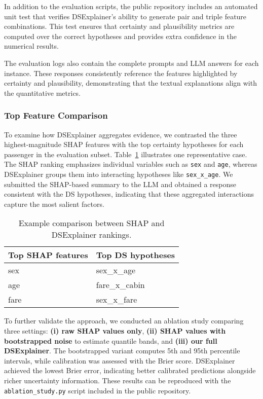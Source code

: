\documentclass[acmlarge]{acmart}
\begin{document}
In addition to the evaluation scripts, the public repository includes an automated unit test that verifies DSExplainer's ability to generate pair and triple feature combinations. This test ensures that certainty and plausibility metrics are computed over the correct hypotheses and provides extra confidence in the numerical results.

The evaluation logs also contain the complete prompts and LLM answers for each instance. These responses consistently reference the features highlighted by certainty and plausibility, demonstrating that the textual explanations align with the quantitative metrics.

\subsubsection{Top Feature Comparison}
To examine how DSExplainer aggregates evidence, we contrasted the three highest-magnitude SHAP features with the top certainty hypotheses for each passenger in the evaluation subset. Table~\ref{tab:shap_vs_ds} illustrates one representative case. The SHAP ranking emphasizes individual variables such as \texttt{sex} and \texttt{age}, whereas DSExplainer groups them into interacting hypotheses like \texttt{sex\_x\_age}. We submitted the SHAP-based summary to the LLM and obtained a response consistent with the DS hypotheses, indicating that these aggregated interactions capture the most salient factors.

\begin{table}[H]
    \caption{Example comparison between SHAP and DSExplainer rankings.}
    \label{tab:shap_vs_ds}
    \centering
    \begin{tabular}{|l|l|}
        \hline
        Top SHAP features & Top DS hypotheses \\
        \hline
        sex  & sex\_x\_age \\
        age  & fare\_x\_cabin \\
        fare & sex\_x\_fare \\
        \hline
    \end{tabular}
\end{table}

To further validate the approach, we conducted an ablation study comparing three settings: \textbf{(i) raw SHAP values only}, \textbf{(ii) SHAP values with bootstrapped noise} to estimate quantile bands, and \textbf{(iii) our full DSExplainer}. The bootstrapped variant computes 5th and 95th percentile intervals, while calibration was assessed with the Brier score. DSExplainer achieved the lowest Brier error, indicating better calibrated predictions alongside richer uncertainty information.
These results can be reproduced with the \texttt{ablation\_study.py} script included in the public repository.
\end{document}
